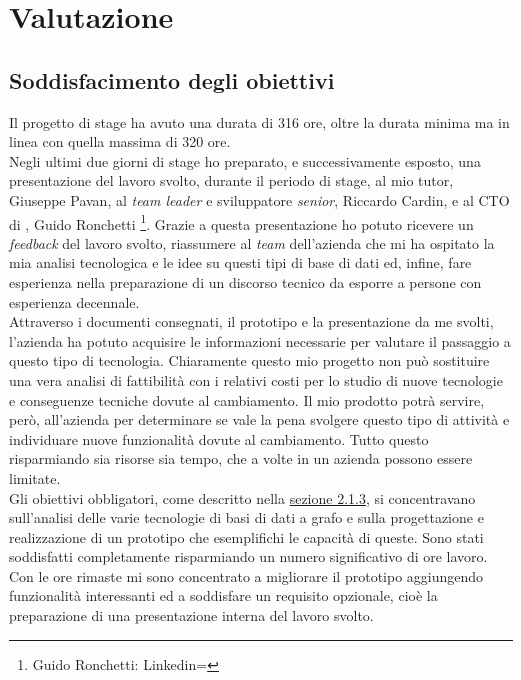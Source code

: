 
\chapter{Valutazione}
\label{cap:resoconto-stage}

\section{Soddisfacimento degli obiettivi}
Il progetto di stage ha avuto una durata di 316 ore, oltre la durata minima ma in linea con quella massima di 320 ore.\\
Negli ultimi due giorni di stage ho preparato, e successivamente esposto, una presentazione del lavoro svolto, durante il periodo di stage, al mio tutor, Giuseppe Pavan, al \textit{team leader} e sviluppatore \textit{senior}, Riccardo Cardin, e al CTO di \textit{\azienda}, Guido Ronchetti \footnote{Guido Ronchetti: Linkedin= }. Grazie a questa presentazione ho potuto ricevere un \textit{feedback} del lavoro svolto, riassumere al \textit{team} dell'azienda che mi ha ospitato la mia analisi tecnologica e le idee su questi tipi di base di dati ed, infine, fare esperienza nella preparazione di un discorso tecnico da esporre a persone con esperienza decennale.\\
Attraverso i documenti consegnati, il prototipo e la presentazione da me svolti, l'azienda ha potuto acquisire le informazioni necessarie per valutare il passaggio a questo tipo di tecnologia. Chiaramente questo mio progetto non può sostituire una vera analisi di fattibilità con i relativi costi per lo studio di nuove tecnologie e conseguenze tecniche dovute al cambiamento. Il mio prodotto potrà servire, però, all'azienda per determinare se vale la pena svolgere questo tipo di attività e individuare nuove funzionalità dovute al cambiamento. Tutto questo risparmiando sia risorse sia tempo, che a volte in un azienda possono essere limitate.\\
Gli obiettivi obbligatori, come descritto nella \hyperlink{sec:pianodl}{sezione 2.1.3}, si concentravano sull'analisi delle varie tecnologie di basi di dati a grafo e sulla progettazione e realizzazione di un prototipo che esemplifichi le capacità di queste. Sono stati soddisfatti completamente risparmiando un numero significativo di ore lavoro. Con le ore rimaste mi sono concentrato a migliorare il prototipo aggiungendo funzionalità interessanti ed a soddisfare un requisito opzionale, cioè la preparazione di una presentazione interna del lavoro svolto.
\newpage
